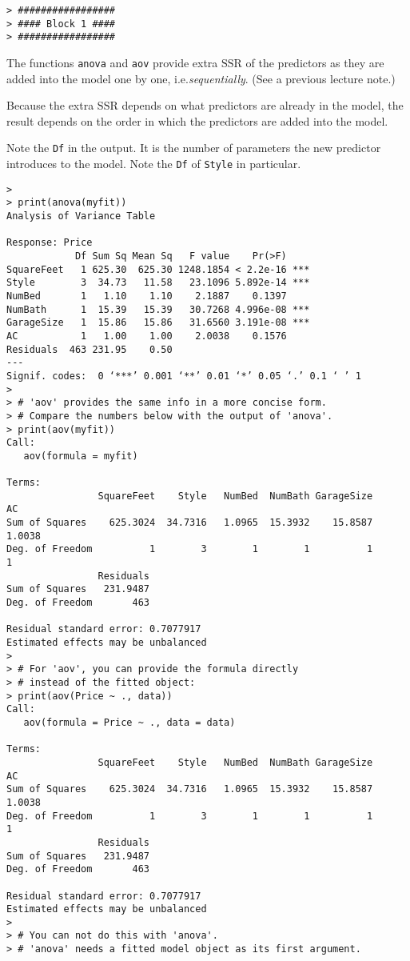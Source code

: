 \documentclass[12pt]{article}
\newcommand\SSR{\text{SSR}}
\begin{document}
\begin{verbatim}
> #################
> #### Block 1 ####
> #################
\end{verbatim}

The functions \verb+anova+ and \verb+aov+
provide extra $\SSR$ of the predictors as they
are added into the model one by one, i.e.\@ \emph{sequentially}.
(See a previous lecture note.)

Because the extra $\SSR$ depends on what predictors are already in the
model, the result depends on the order in which the predictors are added
into the model.

Note the \verb+Df+ in the output.
It is the number of parameters the new predictor introduces to the
model. Note the \verb+Df+ of \verb+Style+ in particular.

\begin{verbatim}
> 
> print(anova(myfit))
Analysis of Variance Table

Response: Price
            Df Sum Sq Mean Sq   F value    Pr(>F)    
SquareFeet   1 625.30  625.30 1248.1854 < 2.2e-16 ***
Style        3  34.73   11.58   23.1096 5.892e-14 ***
NumBed       1   1.10    1.10    2.1887    0.1397    
NumBath      1  15.39   15.39   30.7268 4.996e-08 ***
GarageSize   1  15.86   15.86   31.6560 3.191e-08 ***
AC           1   1.00    1.00    2.0038    0.1576    
Residuals  463 231.95    0.50                        
---
Signif. codes:  0 ‘***’ 0.001 ‘**’ 0.01 ‘*’ 0.05 ‘.’ 0.1 ‘ ’ 1 
> 
> # 'aov' provides the same info in a more concise form.
> # Compare the numbers below with the output of 'anova'.
> print(aov(myfit))
Call:
   aov(formula = myfit)

Terms:
                SquareFeet    Style   NumBed  NumBath GarageSize       AC
Sum of Squares    625.3024  34.7316   1.0965  15.3932    15.8587   1.0038
Deg. of Freedom          1        3        1        1          1        1
                Residuals
Sum of Squares   231.9487
Deg. of Freedom       463

Residual standard error: 0.7077917 
Estimated effects may be unbalanced
> 
> # For 'aov', you can provide the formula directly
> # instead of the fitted object:
> print(aov(Price ~ ., data))
Call:
   aov(formula = Price ~ ., data = data)

Terms:
                SquareFeet    Style   NumBed  NumBath GarageSize       AC
Sum of Squares    625.3024  34.7316   1.0965  15.3932    15.8587   1.0038
Deg. of Freedom          1        3        1        1          1        1
                Residuals
Sum of Squares   231.9487
Deg. of Freedom       463

Residual standard error: 0.7077917 
Estimated effects may be unbalanced
> 
> # You can not do this with 'anova'.
> # 'anova' needs a fitted model object as its first argument.
\end{verbatim}
\end{document}
